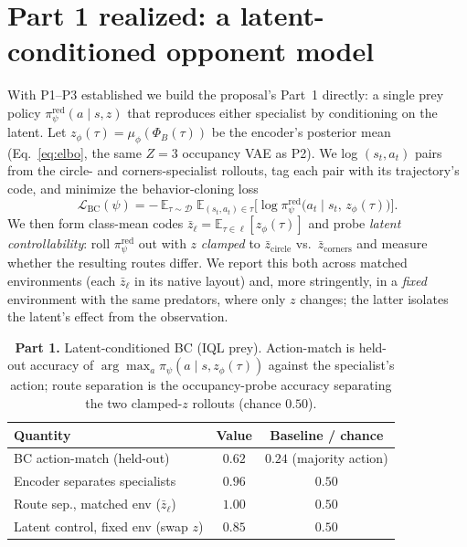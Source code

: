 \documentclass[11pt]{article}
\newcommand{\expect}{\mathbb{E}}
\newcommand{\occ}{\Phi}
\newcommand{\zlat}{z}
\begin{document}
\section{Part 1 realized: a latent-conditioned opponent model}

With P1--P3 established we build the proposal's Part~1 directly: a single prey
policy $\pi^{\mathrm{red}}_\psi(a \mid s, \zlat)$ that reproduces either
specialist by conditioning on the latent. Let $z_\phi(\tau) = \mu_\phi(\occ_B(\tau))$
be the encoder's posterior mean (Eq.~\ref{eq:elbo}, the same $Z = 3$ occupancy
VAE as P2). We log $(s_t, a_t)$ pairs from the circle- and corners-specialist
rollouts, tag each pair with its trajectory's code, and minimize the
behavior-cloning loss
\begin{equation}
  \mathcal{L}_{\mathrm{BC}}(\psi)
  = -\,\expect_{\tau \sim \mathcal{D}}\;
      \expect_{(s_t,a_t)\in\tau}
      \Big[\log \pi^{\mathrm{red}}_\psi\!\big(a_t \mid s_t,\, z_\phi(\tau)\big)\Big].
  \label{eq:bc}
\end{equation}
We then form class-mean codes $\bar z_\ell = \expect_{\tau \in \ell}[z_\phi(\tau)]$
and probe \emph{latent controllability}: roll $\pi^{\mathrm{red}}_\psi$ out with
$\zlat$ \emph{clamped} to $\bar z_{\mathrm{circle}}$ vs.\ $\bar z_{\mathrm{corners}}$
and measure whether the resulting routes differ. We report this both
across matched environments (each $\bar z_\ell$ in its native layout) and, more
stringently, in a \emph{fixed} environment with the same predators, where only
$\zlat$ changes; the latter isolates the latent's effect from the observation.

\begin{table}[h]
  \centering
  \caption{\textbf{Part 1.} Latent-conditioned BC (IQL prey). Action-match is
  held-out accuracy of $\arg\max_a \pi_\psi(a \mid s, z_\phi(\tau))$ against the
  specialist's action; route separation is the occupancy-probe accuracy
  separating the two clamped-$\zlat$ rollouts (chance $0.50$).}\label{tab:part1}
  \begin{tabular}{@{}lcc@{}}
    \toprule
    Quantity & Value & Baseline / chance \\
    \midrule
    BC action-match (held-out)               & $0.62$ & $0.24$ (majority action) \\
    Encoder separates specialists            & $0.96$ & $0.50$ \\
    Route sep., matched env ($\bar z_\ell$)  & $\mathbf{1.00}$ & $0.50$ \\
    Latent control, fixed env (swap $\zlat$) & $\mathbf{0.85}$ & $0.50$ \\
    \bottomrule
  \end{tabular}
\end{table}
\end{document}
